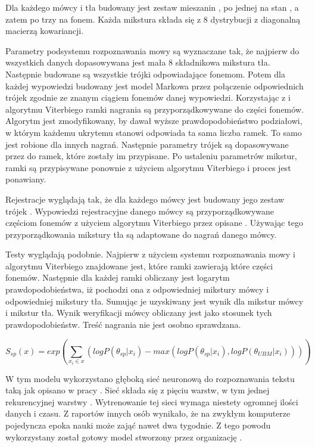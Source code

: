 Dla każdego mówcy i tła budowany jest zestaw mieszanin , po jednej na stan ,
a zatem po trzy na fonem. Każda mikstura składa się z $8$ dystrybucji z diagonalną macierzą kowariancji.

Parametry podsystemu rozpoznawania mowy są wyznaczane tak, że najpierw do wszystkich danych
dopasowywana jest mała 8 składnikowa mikstura tła. Następnie budowane są wszystkie trójki 
odpowiadające fonemom. Potem dla każdej wypowiedzi budowany jest model Markowa przez połączenie odpowiednich
trójek zgodnie ze znanym ciągiem fonemów danej wypowiedzi. Korzystając z  i algorytmu Viterbiego
ramki nagrania są przyporządkowywane do części fonemów. Algorytm jest zmodyfikowany, by dawał wyższe prawdopodobieństwo
podziałowi, w którym każdemu ukrytemu stanowi odpowiada ta sama liczba ramek. To samo jest robione dla innych nagrań.
Następnie parametry trójek  są dopasowywane przez  do ramek, które zostały im przypisane.
Po ustaleniu parametrów mikstur, ramki są przypisywane ponownie z użyciem algorytmu Viterbiego i proces jest ponawiany.

Rejestracje wyglądają tak, że dla każdego mówcy jest budowany jego zestaw trójek .
Wypowiedzi rejestracyjne danego mówcy są przyporządkowywane
częściom fonemów z użyciem algorytmu Viterbiego przez opisane .
Używając tego przyporządkowania mikstury tła są  adaptowane do nagrań danego mówcy.

Testy wyglądają podobnie. Najpierw z użyciem systemu rozpoznawania mowy i algorytmu Viterbiego znajdowane
jest, które ramki zawierają które części fonemów. Następnie dla każdej ramki obliczany jest logarytm prawdopodobieństwa,
iż pochodzi ona z odpowiedniej mikstury mówcy i odpowiedniej mikstury tła. Sumując je uzyskiwany jest wynik dla mikstur
mówcy i mikstur tła. Wynik weryfikacji mówcy obliczany jest jako stosunek tych prawdopodobieństw. Treść
nagrania nie jest osobno sprawdzana.

$$S_{sp}(x) = exp(\sum_{x_i \in x} (log P(\theta_{sp} | x_i) - max(log P(\theta_{sp} | x_i), log P(\theta_{UBM} | x_i))))$$

\label{sec:dnn_gmm}

W tym modelu wykorzystano głęboką sieć neuronową do rozpoznawania tekstu taką jak opisano w pracy \cite{endToEnd}.
Sieć składa się z pięciu warstw, w tym jednej rekurencyjnej warstwy .
Wytrenowanie tej sieci wymaga niestety ogromnej ilości danych i czasu. Z raportów innych osób wynikało, że na
zwykłym komputerze pojedyncza epoka nauki może zająć nawet dwa tygodnie. Z tego powodu wykorzystany został
gotowy model stworzony przez organizację .

